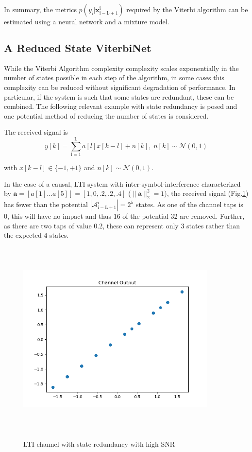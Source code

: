 \documentclass[12pt,a4paper]{article}
\begin{document}
In summary, the metrics $p(y_{\mathrm{i}}|\mathbf{x}_{\mathrm{i-L+1}}^{\mathrm{i}})$ required by the Viterbi algorithm can be estimated using a neural network and a mixture model.





\subsection{A Reduced State ViterbiNet}
While the Viterbi Algorithm complexity complexity scales exponentially in the number of states possible in each step of the algorithm, in some cases this complexity can be reduced without significant degradation of performance. In particular, if the system is such that some states are redundant, these can be combined. The following relevant example with state redundancy is posed and one potential method of reducing the number of states is considered. 

The received signal is
\begin{equation}
y[k] = \sum_{\mathrm{l=1}}^{\mathrm{L}} a[l]x[k-l] + n[k], \; n[k]  \sim \mathcal{N}(0,1)
\end{equation}

with $x[k-l] \in \{ -1, +1\}$ and $n[k]  \sim \mathcal{N}(0,1)$.  

In the case of a causal, LTI system with inter-symbol-interference characterized by $\mathbf{a} = [a[1]...a[5]]=[1, 0, .2, .2, .4]$ ($\|\mathbf{a}\|^2_2 = 1$), the received signal (Fig.\ref{fig:redundant_channel}) has fewer than the potential $|\mathcal{A}_{\mathrm{i-L+1}}^{\mathrm{i}}| =2^5$ states. As one of the channel taps is 0, this will have no impact and thus 16 of the potential 32 are removed. Further, as there are two taps of value 0.2, these can represent only 3 states rather than the expected 4 states. 

\begin{figure}[H]
\centering
	\includegraphics[width=10cm,height = 10cm]{system_model/channel_output}
	  \label{fig:redundant_channel}
	  	  \caption{LTI channel with state redundancy with high SNR}
\end{figure}
\end{document}
